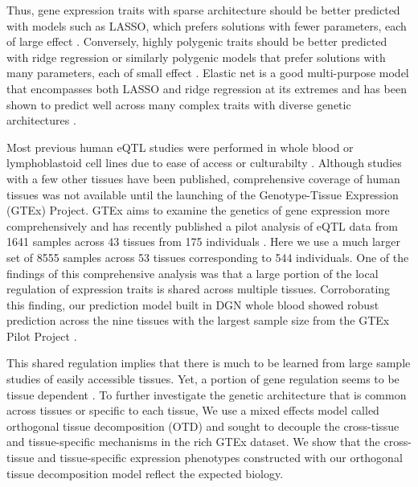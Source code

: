 \documentclass[10pt,letterpaper]{article}
\begin{document}
Thus, gene expression traits with sparse architecture should be better predicted with models such as LASSO, which prefers solutions with fewer parameters, each of large effect \cite{Tibshirani_1996}. Conversely, highly polygenic traits should be better predicted with ridge regression or similarly polygenic models that prefer solutions with many parameters, each of small effect \cite{Hoerl_1970,de_los_Campos_2010,Wheeler_2014}. Elastic net \cite{Zou_2005} is a good multi-purpose model that encompasses both LASSO and ridge regression at its extremes and has been shown to predict well across many complex traits with diverse genetic architectures \cite{abraham2013performance}. 

Most previous human eQTL studies were performed in whole blood or lymphoblastoid cell lines due to ease of access or culturabilty \cite{Stranger_2007,Cheung_2005,Battle_2013}. Although studies with a few other tissues have been published, comprehensive coverage of human tissues was not available until the launching of the Genotype-Tissue Expression (GTEx) Project. GTEx aims to examine the genetics of gene expression more comprehensively and has recently published a pilot analysis of eQTL data from 1641 samples across 43 tissues from 175 individuals \cite{Ardlie_2015}. Here we use a much larger set of 8555 samples across 53 tissues corresponding to 544 individuals. One of the findings of this comprehensive analysis was that a large portion of the local regulation of expression traits is shared across multiple tissues. Corroborating this finding, our prediction model built in DGN whole blood showed robust prediction \cite{Gamazon_2015} across the nine tissues with the largest sample size from the GTEx Pilot Project \cite{Ardlie_2015}.

This shared regulation implies that there is much to be learned from large sample studies of easily accessible tissues. Yet, a portion of gene regulation seems to be tissue dependent \cite{Ardlie_2015}. To further investigate the genetic architecture that is common across tissues or specific to each tissue, 
 We use a mixed effects model called orthogonal tissue decomposition (OTD) and sought to decouple the cross-tissue and tissue-specific mechanisms in the rich GTEx dataset. We show that the cross-tissue and tissue-specific expression phenotypes constructed with our orthogonal tissue decomposition model reflect the expected biology. %
\end{document}
